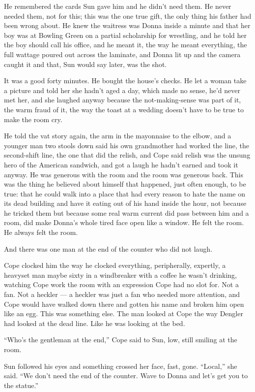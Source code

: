 \documentclass[11pt,openany]{book}
\begin{document}
He remembered the cards Sun gave him and he didn't need them. He never needed them, not for this; this was the one true gift, the only thing his father had been wrong about. He knew the waitress was Donna inside a minute and that her boy was at Bowling Green on a partial scholarship for wrestling, and he told her the boy should call his office, and he meant it, the way he meant everything, the full wattage poured out across the laminate, and Donna lit up and the camera caught it and that, Sun would say later, was the shot.

It was a good forty minutes. He bought the house's checks. He let a woman take a picture and told her she hadn't aged a day, which made no sense, he'd never met her, and she laughed anyway because the not-making-sense was part of it, the warm fraud of it, the way the toast at a wedding doesn't have to be true to make the room cry.

He told the vat story again, the arm in the mayonnaise to the elbow, and a younger man two stools down said his own grandmother had worked the line, the second-shift line, the one that did the relish, and Cope said relish was the unsung hero of the American sandwich, and got a laugh he hadn't earned and took it anyway. He was generous with the room and the room was generous back. This was the thing he believed about himself that happened, just often enough, to be true: that he could walk into a place that had every reason to hate the name on its dead building and have it eating out of his hand inside the hour, not because he tricked them but because some real warm current did pass between him and a room, did make Donna's whole tired face open like a window. He felt the room. He always felt the room.

And there was one man at the end of the counter who did not laugh.

Cope clocked him the way he clocked everything, peripherally, expertly, a heavyset man maybe sixty in a windbreaker with a coffee he wasn't drinking, watching Cope work the room with an expression Cope had no slot for. Not a fan. Not a heckler --- a heckler was just a fan who needed more attention, and Cope would have walked down there and gotten his name and broken him open like an egg. This was something else. The man looked at Cope the way Dengler had looked at the dead line. Like he was looking at the bed.

``Who's the gentleman at the end,'' Cope said to Sun, low, still smiling at the room.

Sun followed his eyes and something crossed her face, fast, gone. ``Local,'' she said. ``We don't need the end of the counter. Wave to Donna and let's get you to the statue.''
\end{document}
